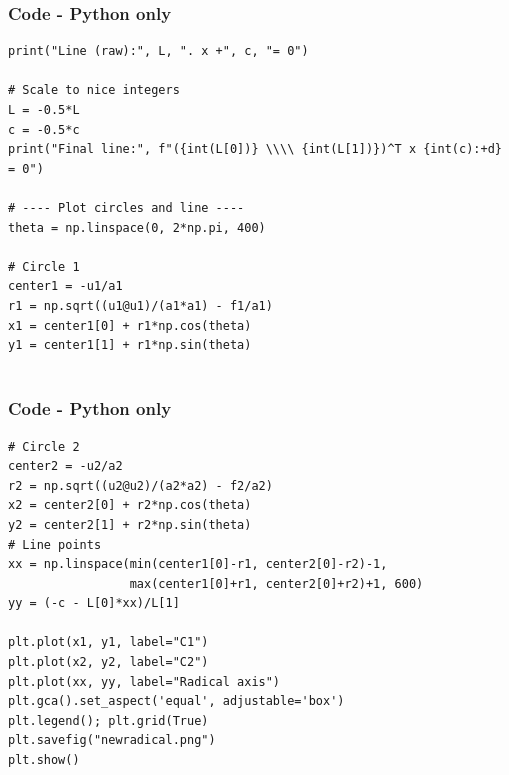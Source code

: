 \documentclass{beamer}
\theoremstyle{remark}
\numberwithin{equation}{section}
\begin{document}
\begin{frame}[fragile]
\frametitle{Code - Python only}
\begin{lstlisting}
print("Line (raw):", L, ". x +", c, "= 0")

# Scale to nice integers
L = -0.5*L
c = -0.5*c
print("Final line:", f"({int(L[0])} \\\\ {int(L[1])})^T x {int(c):+d} = 0")

# ---- Plot circles and line ----
theta = np.linspace(0, 2*np.pi, 400)

# Circle 1
center1 = -u1/a1
r1 = np.sqrt((u1@u1)/(a1*a1) - f1/a1)
x1 = center1[0] + r1*np.cos(theta)
y1 = center1[1] + r1*np.sin(theta)


\end{lstlisting}
\end{frame}

\begin{frame}[fragile]
\frametitle{Code - Python only}
\begin{lstlisting}
# Circle 2
center2 = -u2/a2
r2 = np.sqrt((u2@u2)/(a2*a2) - f2/a2)
x2 = center2[0] + r2*np.cos(theta)
y2 = center2[1] + r2*np.sin(theta)
# Line points
xx = np.linspace(min(center1[0]-r1, center2[0]-r2)-1,
                 max(center1[0]+r1, center2[0]+r2)+1, 600)
yy = (-c - L[0]*xx)/L[1]

plt.plot(x1, y1, label="C1")
plt.plot(x2, y2, label="C2")
plt.plot(xx, yy, label="Radical axis")
plt.gca().set_aspect('equal', adjustable='box')
plt.legend(); plt.grid(True)
plt.savefig("newradical.png")
plt.show()




\end{lstlisting}
\end{frame}
\end{document}
